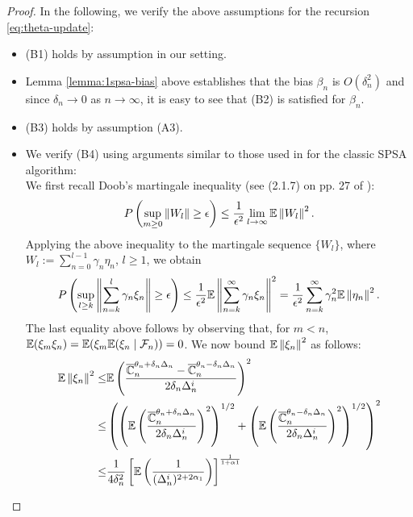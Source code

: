 \documentclass{article}
\numberwithin{equation}{section}
\numberwithin{theorem}{section}
\begin{document}
\begin{proof}
In the following, we verify the above assumptions for the recursion \eqref{eq:theta-update}:
\begin{itemize}
\item (B1) holds by assumption in our setting.

\item Lemma \ref{lemma:1spsa-bias} above establishes that the bias $\beta_n$ is $O(\delta_n^2)$ and since $\delta_n \rightarrow 0$ as $n\rightarrow \infty$, it is easy to see that (B2) is satisfied for $\beta_n$. 

\item (B3) holds by assumption (A3).

\item We verify (B4) using arguments similar to those used in \cite{spall} for the classic SPSA algorithm:\\
We first recall Doob's martingale inequality (see (2.1.7) on pp. 27 of \cite{kushner-clark}):
\begin{align}
P\left( \sup_{m\geq 0}   \left\|W_l\right\| \geq \epsilon \right) \le \dfrac{1}{\epsilon^2} \lim_{l\rightarrow \infty} \mathbb{E} \left\|W_l\right\|^2. 
\end{align}
Applying the above inequality to the martingale sequence $\{W_l\}$, where  $W_l := \sum_{n=0}^{l-1} \gamma_n \eta_n$, $l\ge 1$, we obtain
\begin{align}
P\left( \sup_{l\geq k}   \left\|\sum_{n=k}^{l} \gamma_n \xi_n\right\| \geq \epsilon \right) \le \dfrac{1}{\epsilon^2} \mathbb{E} \left\|
\sum_{n=k}^{\infty} \gamma_n \xi_n\right\|^2 = \dfrac{1}{\epsilon^2} \sum_{n=k}^{\infty} \gamma_n^2 \mathbb{E}\left\| \eta_n\right\|^2. \label{eq:b4}
\end{align}
The last equality above follows by observing that, for $m < n$, $\mathbb{E}(\xi_m \xi_n) = \mathbb{E}(\xi_m \mathbb{E}(\xi_n\mid \mathcal{F}_n))=0$.
We now bound $\mathbb{E}\left\| \xi_n\right\|^2$ as follows:
\begin{align}
\E\left\| \xi_n\right\|^2\le &\E\left(\dfrac{\overline \C_n^{\theta_n + \delta_n \Delta_n} -\overline \C_n^{\theta_n - \delta_n \Delta_n}}{2 \delta_n \Delta_n^i}\right)^2 \label{eq:mi}\\
\le &\left(\left(\E\left(\dfrac{\overline \C_n^{\theta_n + \delta_n \Delta_n}}{2 \delta_n \Delta_n^i}\right)^2\right)^{1/2}
+ \left(\E\left(\dfrac{\overline \C_n^{\theta_n - \delta_n \Delta_n}}{2 \delta_n \Delta_n^i}\right)^2\right)^{1/2}\right)^2 \label{eq:minko}\\
\le &\frac1{4\delta_n^2} \left[ \E\left(\frac1{(\Delta_n^i)^{2+2\alpha_1}}\right) \right]^{\frac{1}{1+\alpha1}} \nonumber\\

\end{align}
\end{itemize}
\end{proof}
\end{document}
